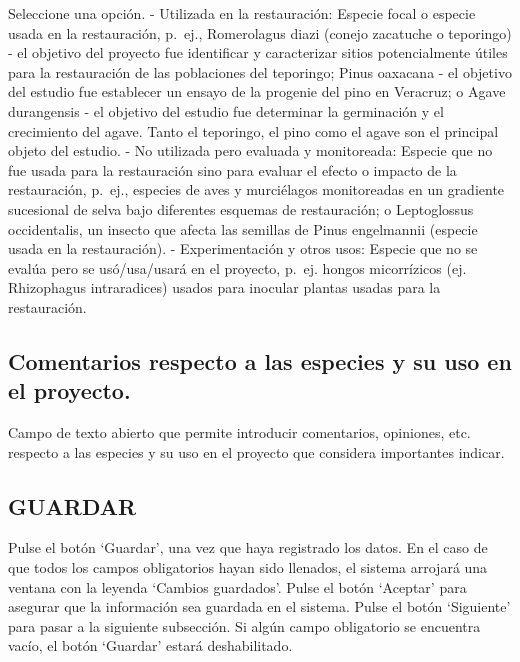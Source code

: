 \documentclass[
]{book}
\begin{document}
Seleccione una opción.
- Utilizada en la restauración: Especie focal o especie usada en la restauración, p.~ej., Romerolagus diazi (conejo zacatuche o teporingo) - el objetivo del proyecto fue identificar y caracterizar sitios potencialmente útiles para la restauración de las poblaciones del teporingo; Pinus oaxacana - el objetivo del estudio fue establecer un ensayo de la progenie del pino en Veracruz; o Agave durangensis - el objetivo del estudio fue determinar la germinación y el crecimiento del agave. Tanto el teporingo, el pino como el agave son el principal objeto del estudio.
- No utilizada pero evaluada y monitoreada: Especie que no fue usada para la restauración sino para evaluar el efecto o impacto de la restauración, p.~ej., especies de aves y murciélagos monitoreadas en un gradiente sucesional de selva bajo diferentes esquemas de restauración; o Leptoglossus occidentalis, un insecto que afecta las semillas de Pinus engelmannii (especie usada en la restauración).
- Experimentación y otros usos: Especie que no se evalúa pero se usó/usa/usará en el proyecto, p.~ej. hongos micorrízicos (ej. Rhizophagus intraradices) usados para inocular plantas usadas para la restauración.

\hypertarget{comentarios-respecto-a-las-especies-y-su-uso-en-el-proyecto.}{%
\subsection{Comentarios respecto a las especies y su uso en el proyecto.}\label{comentarios-respecto-a-las-especies-y-su-uso-en-el-proyecto.}}

Campo de texto abierto que permite introducir comentarios, opiniones, etc. respecto a las especies y su uso en el proyecto que considera importantes indicar.

\hypertarget{guardar-6}{%
\subsection{GUARDAR}\label{guardar-6}}

Pulse el botón `Guardar', una vez que haya registrado los datos.
En el caso de que todos los campos obligatorios hayan sido llenados, el sistema arrojará una ventana con la leyenda `Cambios guardados'. Pulse el botón `Aceptar' para asegurar que la información sea guardada en el sistema.
Pulse el botón `Siguiente' para pasar a la siguiente subsección.
Si algún campo obligatorio se encuentra vacío, el botón `Guardar' estará deshabilitado.
\end{document}
